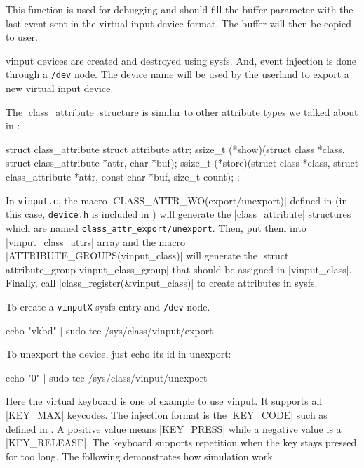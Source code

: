 \documentclass[10pt, oneside]{book}
\begin{document}
This function is used for debugging and should fill the buffer parameter with the last event sent in the virtual input device format.
The buffer will then be copied to user.

vinput devices are created and destroyed using sysfs.
And, event injection is done through a \verb|/dev| node.
The device name will be used by the userland to export a new virtual input device.

The \cpp|class_attribute| structure is similar to other attribute types we talked about in :

\begin{code}
struct class_attribute {
    struct attribute attr;
    ssize_t (*show)(struct class *class, struct class_attribute *attr,
                    char *buf);
    ssize_t (*store)(struct class *class, struct class_attribute *attr,
                    const char *buf, size_t count);
};
\end{code}

In \verb|vinput.c|, the macro \cpp|CLASS_ATTR_WO(export/unexport)| defined in  (in this case, \verb|device.h| is included in ) will generate the \cpp|class_attribute| structures which are named \verb|class_attr_export/unexport|.
Then, put them into \cpp|vinput_class_attrs| array and the macro \cpp|ATTRIBUTE_GROUPS(vinput_class)| will generate the \cpp|struct attribute_group vinput_class_group| that should be assigned in \cpp|vinput_class|.
Finally, call \cpp|class_register(&vinput_class)| to create attributes in sysfs.

To create a \verb|vinputX| sysfs entry and \verb|/dev| node.

\begin{codebash}
echo "vkbd" | sudo tee /sys/class/vinput/export
\end{codebash}

To unexport the device, just echo its id in unexport:

\begin{codebash}
echo "0" | sudo tee /sys/class/vinput/unexport
\end{codebash}


Here the virtual keyboard is one of example to use vinput.
It supports all \cpp|KEY_MAX| keycodes.
The injection format is the \cpp|KEY_CODE| such as defined in .
A positive value means \cpp|KEY_PRESS| while a negative value is a \cpp|KEY_RELEASE|.
The keyboard supports repetition when the key stays pressed for too long.
The following demonstrates how simulation work.
\end{document}
